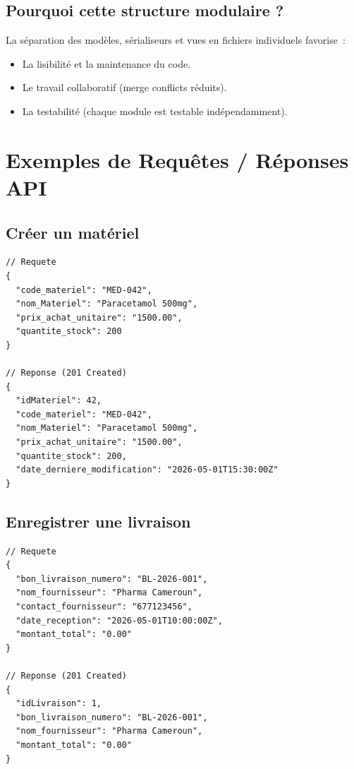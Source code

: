 \documentclass[12pt,a4paper]{report}
\begin{document}
\section{Pourquoi cette structure modulaire ?}
La séparation des modèles, sérialiseurs et vues en fichiers individuels favorise~:
\begin{itemize}
    \item La lisibilité et la maintenance du code.
    \item Le travail collaboratif (merge conflicts réduits).
    \item La testabilité (chaque module est testable indépendamment).
\end{itemize}

\chapter{Exemples de Requêtes / Réponses API}

\section{Créer un matériel}
\begin{lstlisting}[title=POST /api/compta\_matiere/materiels/]
// Requete
{
  "code_materiel": "MED-042",
  "nom_Materiel": "Paracetamol 500mg",
  "prix_achat_unitaire": "1500.00",
  "quantite_stock": 200
}

// Reponse (201 Created)
{
  "idMateriel": 42,
  "code_materiel": "MED-042",
  "nom_Materiel": "Paracetamol 500mg",
  "prix_achat_unitaire": "1500.00",
  "quantite_stock": 200,
  "date_derniere_modification": "2026-05-01T15:30:00Z"
}
\end{lstlisting}

\section{Enregistrer une livraison}
\begin{lstlisting}[title=POST /api/compta\_matiere/livraisons/]
// Requete
{
  "bon_livraison_numero": "BL-2026-001",
  "nom_fournisseur": "Pharma Cameroun",
  "contact_fournisseur": "677123456",
  "date_reception": "2026-05-01T10:00:00Z",
  "montant_total": "0.00"
}

// Reponse (201 Created)
{
  "idLivraison": 1,
  "bon_livraison_numero": "BL-2026-001",
  "nom_fournisseur": "Pharma Cameroun",
  "montant_total": "0.00"
}
\end{lstlisting}
\end{document}
